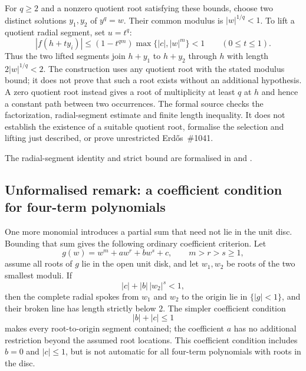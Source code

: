 \documentclass[11pt]{article}
\begin{document}
For $q\ge2$ and a nonzero quotient root satisfying these bounds, choose
two distinct solutions $y_1,y_2$ of $y^q=w$. Their common modulus is
$|w|^{1/q}<1$. To lift a quotient radial segment, set $u=t^q$:
\[
 |f(h+ty_i)|
 \le (1-t^{qm})\max\{|c|,|w|^m\}<1
 \qquad(0\le t\le1).
\]
Thus the two lifted segments join $h+y_1$ to $h+y_2$ through $h$
with length $2|w|^{1/q}<2$. The construction uses any quotient root
with the stated modulus bound; it does not prove that such a root
exists without an additional hypothesis. A zero quotient root instead
gives a root of multiplicity at least $q$ at $h$ and hence a constant
path between two occurrences. The formal source checks the
factorization, radial-segment estimate and finite length inequality.
It does not establish the existence of a suitable quotient root,
formalise the selection and lifting just described, or prove
unrestricted Erd\H{o}s~\#1041.

The radial-segment identity and strict bound are formalised in
and .

\subsection*{Unformalised remark: a coefficient condition for four-term polynomials}

One more monomial introduces a partial sum that need not lie in the
unit disc. Bounding that sum gives the following ordinary coefficient
criterion. Let
\[
  g(w)=w^m+aw^r+bw^s+c,\qquad m>r>s\ge1,
\]
assume all roots of $g$ lie in the open unit disk, and let $w_1,w_2$ be roots
of the two smallest moduli.  If
\[
  |c|+|b|\,|w_2|^s<1,
\]
then the complete radial spokes from $w_1$ and $w_2$ to the origin lie in
$\{|g|<1\}$, and their broken line has length strictly below $2$.  The simpler
coefficient condition
\[
  |b|+|c|\le1
\]
makes every root-to-origin segment contained; the coefficient $a$ has
no additional restriction beyond the assumed root locations. This coefficient
condition includes $b=0$ and $|c|\le1$, but is not automatic for all
four-term polynomials with roots in the disc.
\end{document}
